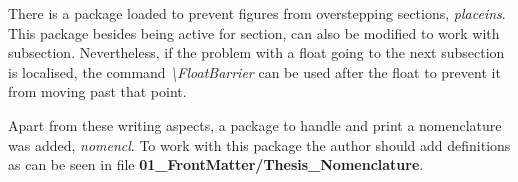 There is a package loaded to prevent figures from overstepping sections, \emph{placeins}.
This package besides being active for section, can also be modified to work with subsection.
Nevertheless, if the problem with a float going to the next subsection is localised, the command \emph{\textbackslash{}FloatBarrier} can be used after the float to prevent it from moving past that point.

Apart from these writing aspects, a package to handle and print a nomenclature was added, \emph{nomencl}.
To work with this package the author should add definitions as can be seen in file \textbf{01\_FrontMatter/Thesis\_Nomenclature}.











